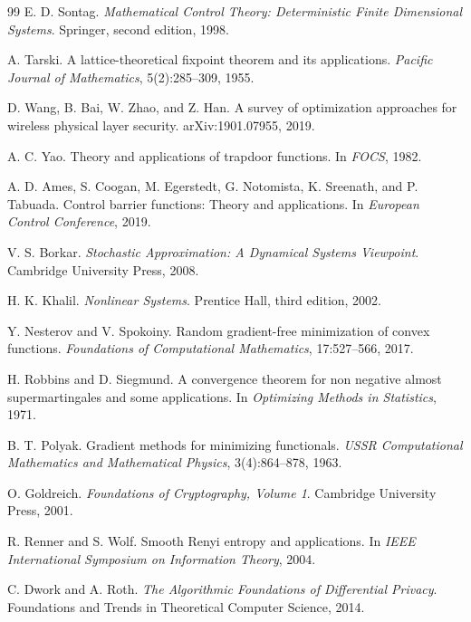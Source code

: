 \documentclass[11pt]{article}
\theoremstyle{definition}
\theoremstyle{plain}
\theoremstyle{remark}
\begin{document}
\begin{thebibliography}{99}
E. D. Sontag.
\newblock \emph{Mathematical Control Theory: Deterministic Finite Dimensional Systems}.
\newblock Springer, second edition, 1998.

A. Tarski.
\newblock A lattice-theoretical fixpoint theorem and its applications.
\newblock \emph{Pacific Journal of Mathematics}, 5(2):285--309, 1955.

D. Wang, B. Bai, W. Zhao, and Z. Han.
\newblock A survey of optimization approaches for wireless physical layer security.
\newblock arXiv:1901.07955, 2019.

A. C. Yao.
\newblock Theory and applications of trapdoor functions.
\newblock In \emph{FOCS}, 1982.

A. D. Ames, S. Coogan, M. Egerstedt, G. Notomista, K. Sreenath, and P. Tabuada.
\newblock Control barrier functions: Theory and applications.
\newblock In \emph{European Control Conference}, 2019.

V. S. Borkar.
\newblock \emph{Stochastic Approximation: A Dynamical Systems Viewpoint}.
\newblock Cambridge University Press, 2008.

H. K. Khalil.
\newblock \emph{Nonlinear Systems}.
\newblock Prentice Hall, third edition, 2002.

Y. Nesterov and V. Spokoiny.
\newblock Random gradient-free minimization of convex functions.
\newblock \emph{Foundations of Computational Mathematics}, 17:527--566, 2017.

H. Robbins and D. Siegmund.
\newblock A convergence theorem for non negative almost supermartingales and some applications.
\newblock In \emph{Optimizing Methods in Statistics}, 1971.

B. T. Polyak.
\newblock Gradient methods for minimizing functionals.
\newblock \emph{USSR Computational Mathematics and Mathematical Physics}, 3(4):864--878, 1963.


O. Goldreich.
\newblock \emph{Foundations of Cryptography, Volume 1}.
\newblock Cambridge University Press, 2001.

R. Renner and S. Wolf.
\newblock Smooth Renyi entropy and applications.
\newblock In \emph{IEEE International Symposium on Information Theory}, 2004.

C. Dwork and A. Roth.
\newblock \emph{The Algorithmic Foundations of Differential Privacy}.
\newblock Foundations and Trends in Theoretical Computer Science, 2014.

\end{thebibliography}
\end{document}
